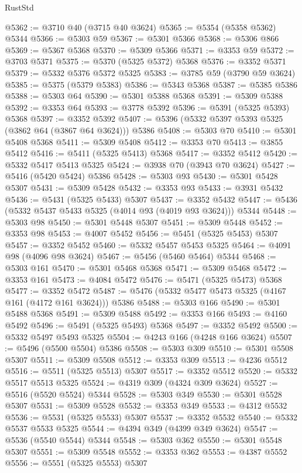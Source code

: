 \begin{lexlean}{RustStd}
\begin{coremodule}
@5362 := @3710 @40 (@3715 @40 @3624)
@5365 := @5354 (@5358 @5362) @5344
@5366 := @5303 @59
@5367 := @5301 @5366
@5368 := @5306 @866
@5369 := @5367 @5368
@5370 := @5309 @5366
@5371 := @3353 @59
@5372 := @3703 @5371
@5375 := @5370 (@5325 @5372) @5368
@5376 := @3352 @5371
@5379 := @5332 @5376 @5372 @5325
@5383 := @3785 @59 (@3790 @59 @3624)
@5385 := @5375 (@5379 @5383)
@5386 := @5343 @5368
@5387 := @5385 @5386
@5388 := @5303 @64
@5390 := @5301 @5388 @5368
@5391 := @5309 @5388
@5392 := @3353 @64
@5393 := @3778 @5392
@5396 := @5391 (@5325 @5393) @5368
@5397 := @3352 @5392
@5407 := @5396 (@5332 @5397 @5393 @5325 (@3862 @64 (@3867 @64 @3624))) @5386
@5408 := @5303 @70
@5410 := @5301 @5408 @5368
@5411 := @5309 @5408
@5412 := @3353 @70
@5413 := @3855 @5412
@5416 := @5411 (@5325 @5413) @5368
@5417 := @3352 @5412
@5420 := @5332 @5417 @5413 @5325
@5424 := @3938 @70 (@3943 @70 @3624)
@5427 := @5416 (@5420 @5424) @5386
@5428 := @5303 @93
@5430 := @5301 @5428 @5307
@5431 := @5309 @5428
@5432 := @3353 @93
@5433 := @3931 @5432
@5436 := @5431 (@5325 @5433) @5307
@5437 := @3352 @5432
@5447 := @5436 (@5332 @5437 @5433 @5325 (@4014 @93 (@4019 @93 @3624))) @5344
@5448 := @5303 @98
@5450 := @5301 @5448 @5307
@5451 := @5309 @5448
@5452 := @3353 @98
@5453 := @4007 @5452
@5456 := @5451 (@5325 @5453) @5307
@5457 := @3352 @5452
@5460 := @5332 @5457 @5453 @5325
@5464 := @4091 @98 (@4096 @98 @3624)
@5467 := @5456 (@5460 @5464) @5344
@5468 := @5303 @161
@5470 := @5301 @5468 @5368
@5471 := @5309 @5468
@5472 := @3353 @161
@5473 := @4084 @5472
@5476 := @5471 (@5325 @5473) @5368
@5477 := @3352 @5472
@5487 := @5476 (@5332 @5477 @5473 @5325 (@4167 @161 (@4172 @161 @3624))) @5386
@5488 := @5303 @166
@5490 := @5301 @5488 @5368
@5491 := @5309 @5488
@5492 := @3353 @166
@5493 := @4160 @5492
@5496 := @5491 (@5325 @5493) @5368
@5497 := @3352 @5492
@5500 := @5332 @5497 @5493 @5325
@5504 := @4243 @166 (@4248 @166 @3624)
@5507 := @5496 (@5500 @5504) @5386
@5508 := @5303 @309
@5510 := @5301 @5508 @5307
@5511 := @5309 @5508
@5512 := @3353 @309
@5513 := @4236 @5512
@5516 := @5511 (@5325 @5513) @5307
@5517 := @3352 @5512
@5520 := @5332 @5517 @5513 @5325
@5524 := @4319 @309 (@4324 @309 @3624)
@5527 := @5516 (@5520 @5524) @5344
@5528 := @5303 @349
@5530 := @5301 @5528 @5307
@5531 := @5309 @5528
@5532 := @3353 @349
@5533 := @4312 @5532
@5536 := @5531 (@5325 @5533) @5307
@5537 := @3352 @5532
@5540 := @5332 @5537 @5533 @5325
@5544 := @4394 @349 (@4399 @349 @3624)
@5547 := @5536 (@5540 @5544) @5344
@5548 := @5303 @362
@5550 := @5301 @5548 @5307
@5551 := @5309 @5548
@5552 := @3353 @362
@5553 := @4387 @5552
@5556 := @5551 (@5325 @5553) @5307

\end{coremodule}
\end{lexlean}
